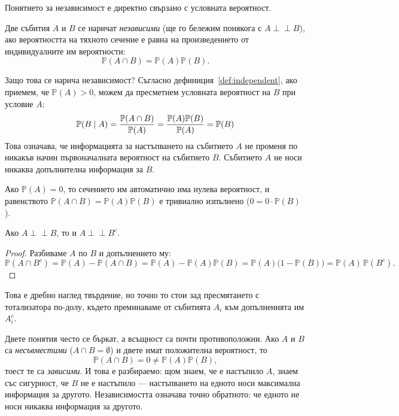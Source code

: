 Понятието за независимост е директно свързано с условната вероятност.
\begin{keydefn}\label{def:independent}
Две събития $A$ и $B$ се наричат \emph{независими} (ще го бележим понякога с $A \perp\!\!\!\perp B$), ако вероятността на тяхното сечение е равна на произведението от индивидуалните им вероятности:
\[
\mathbb{P}(A \cap B) = \mathbb{P}(A)\mathbb{P}(B) .
\]
\end{keydefn}

Защо това се нарича независимост? Съгласно дефиниция~\ref{def:independent}, ако приемем, че $\mathbb{P}(A) > 0$, можем да пресметнем условната вероятност на $B$ при условие $A$:
\[
\mathbb{P}(B \mid A) = \frac{\mathbb{P}(A \cap B)}{\mathbb{P}(A)} = \frac{\mathbb{P}(A)\mathbb{P}(B)}{\mathbb{P}(A)} = \mathbb{P}(B)
\]
Това означава, че информацията за настъпването на събитието $A$ не променя по никакъв начин първоначалната вероятност на събитието $B$. Събитието $A$ не носи никаква допълнителна информация за $B$.

Ако $\mathbb{P}(A) = 0$, то сечението им автоматично има нулева вероятност, и равенството $\mathbb{P}(A \cap B) = \mathbb{P}(A)\mathbb{P}(B)$ е тривиално изпълнено ($0 = 0 \cdot \mathbb{P}(B)$).

\begin{prop}\label{prop:indep-complement}
Ако $A \perp\!\!\!\perp B$, то и $A \perp\!\!\!\perp B^c$.
\end{prop}

\begin{proof}
Разбиваме $A$ по $B$ и допълнението му:
\[
\mathbb{P}(A \cap B^c) = \mathbb{P}(A) - \mathbb{P}(A \cap B)
 = \mathbb{P}(A) - \mathbb{P}(A)\mathbb{P}(B)
 = \mathbb{P}(A)\big(1 - \mathbb{P}(B)\big) = \mathbb{P}(A)\,\mathbb{P}(B^c) .
\]
\end{proof}

Това е дребно наглед твърдение, но точно то стои зад пресмятането с тотализатора по-долу,
където преминаваме от събитията $A_i$ към допълненията им $A_i^c$.

\begin{remark}\label{rem:disjoint-not-indep}
Двете понятия често се бъркат, а всъщност са почти противоположни. Ако $A$ и $B$ са
\emph{несъвместими} ($A \cap B = \emptyset$) и двете имат положителна вероятност, то
\[
\mathbb{P}(A \cap B) = 0 \neq \mathbb{P}(A)\mathbb{P}(B),
\]
тоест те са \emph{зависими}. И това е разбираемо: щом знаем, че е настъпило $A$, знаем със
сигурност, че $B$ не е настъпило — настъпването на едното носи максимална информация за
другото. Независимостта означава точно обратното: че едното не носи никаква информация за
другото.
\end{remark}

